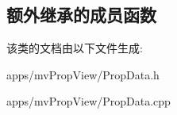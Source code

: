 \subsection*{额外继承的成员函数}


该类的文档由以下文件生成\+:\begin{DoxyCompactItemize}
\item 
apps/mv\+Prop\+View/Prop\+Data.\+h\item 
apps/mv\+Prop\+View/Prop\+Data.\+cpp\end{DoxyCompactItemize}
